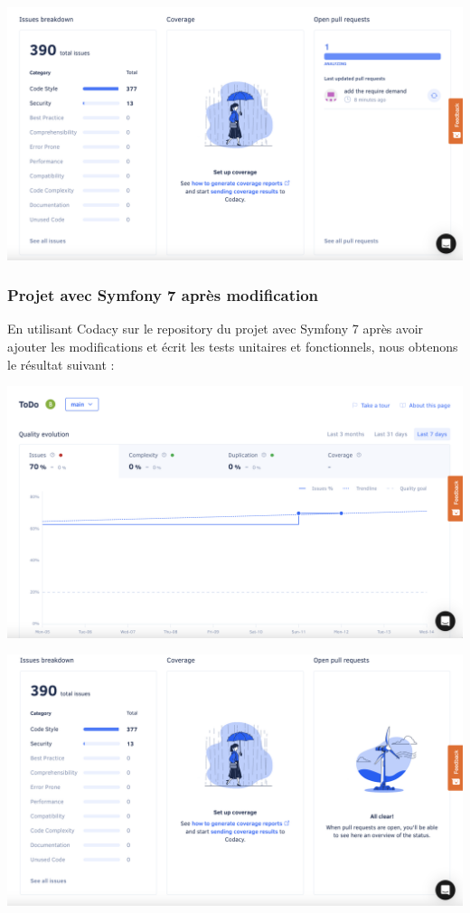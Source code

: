 \documentclass{article}
\theoremstyle{definition}
\theoremstyle{remark}
\begin{document}
\hspace*{2cm}

\includegraphics[scale=0.4]{Capture_new_avant_modif/ToDo_new_avant_modif_2.png}

\subsubsection{Projet avec Symfony 7 après modification}

En utilisant Codacy sur le repository du projet avec Symfony 7 après avoir ajouter les modifications et écrit les tests unitaires et fonctionnels, nous obtenons le résultat suivant : 

\hspace*{2cm}

\includegraphics[scale=0.4]{Capture_ToDo/ToDo_new_1.png}

\hspace*{2cm}

\includegraphics[scale=0.4]{Capture_ToDo/ToDo_new_2.png}
\end{document}
